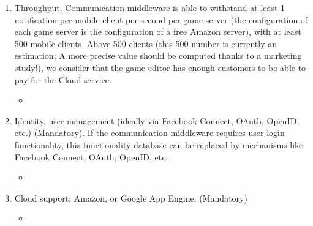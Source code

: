 \begin{enumerate}
\begin{itemize}
\end{itemize}
\item Throughput. Communication middleware is able to withstand at
  least 1 notification per mobile client per second per game server
  (the configuration of each game server is the configuration of a
  free Amazon server), with at least 500 mobile clients. Above 500
  clients (this 500 number is currently an estimation; A more precise
  value should be computed thanks to a marketing study!), we consider
  that the game editor has enough customers to be able to pay for the
  Cloud service.
\label{R_16}
\begin{itemize}
\item {}
\end{itemize}
\item Identity, user management (ideally via Facebook Connect, OAuth,
  OpenID, etc.) (Mandatory). If the communication
  middleware requires user login functionality, this functionality
  database can be replaced by mechanisms like Facebook Connect, OAuth,
  OpenID, etc.
\label{R_17}
\begin{itemize}
\item {}
\end{itemize}
\item Cloud support: Amazon, or Google App Engine. (Mandatory)
\label{R_18}
\begin{itemize}
\item {}
\end{itemize}
\end{enumerate}

\endinput
